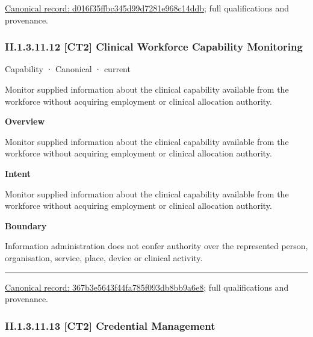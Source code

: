 {\footnotesize \href{../../../../continuum/strategy/capability/d016f35ffbc345d99d7281e968c14ddb.md}{Canonical record: d016f35ffbc345d99d7281e968c14ddb}; full qualifications and provenance.}\par
\subsubsection*{II.1.3.11.12 [CT2] Clinical Workforce Capability Monitoring}
\label{navigation:II.1.3.11.12}

\label{element:367b3e5643f44fa785f093db8bb9a6e8}
{\small Capability · Canonical · current}\par

Monitor supplied information about the clinical capability available from the workforce without acquiring employment or clinical allocation authority.



\textbf{Overview}



Monitor supplied information about the clinical capability available from the workforce without acquiring employment or clinical allocation authority.



\textbf{Intent}



Monitor supplied information about the clinical capability available from the workforce without acquiring employment or clinical allocation authority.



\textbf{Boundary}



Information administration does not confer authority over the represented person, organisation, service, place, device or clinical activity.



\medskip\hrule\medskip

{\footnotesize \href{../../../../continuum/strategy/capability/367b3e5643f44fa785f093db8bb9a6e8.md}{Canonical record: 367b3e5643f44fa785f093db8bb9a6e8}; full qualifications and provenance.}\par
\subsubsection*{II.1.3.11.13 [CT2] Credential Management}
\label{navigation:II.1.3.11.13}


